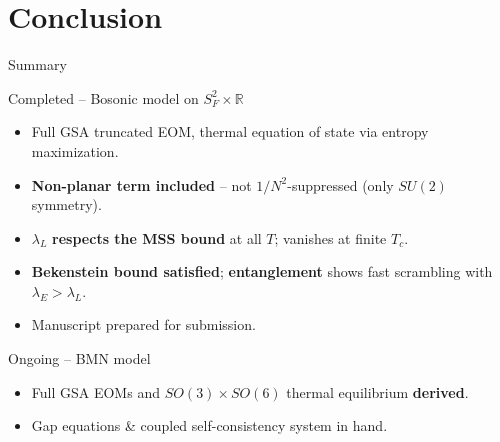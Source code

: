 \documentclass{beamer}
\newcommand{\hl}[1]{{\color{metured}\textbf{#1}}}
\newcommand{\new}[1]{{\color{metuaccent}\textbf{#1}}}
\begin{document}
\section{Conclusion}

\begin{frame}{Summary}
  \vspace{-0.9em}
  \begin{block}{Completed -- Bosonic model on $S_F^2\times\mathbb{R}$}
    \begin{itemize}
      \item Full GSA truncated EOM, thermal equation of state via entropy maximization.
      \item \new{Non-planar term included} -- not $1/N^2$-suppressed (only $SU(2)$ symmetry).
      \item $\lambda_L$ \hl{respects the MSS bound} at all $T$; vanishes at finite $T_c$.
      \item \new{Bekenstein bound satisfied}; \new{entanglement} shows fast scrambling with $\lambda_E>\lambda_L$.
      \item Manuscript prepared for submission.
    \end{itemize}
  \end{block}
  \vspace{-0.8em}
  \begin{block}{Ongoing -- BMN model}
    \begin{itemize}
      \item Full GSA EOMs and $SO(3)\times SO(6)$ thermal equilibrium \new{derived}.
      \item Gap equations \& coupled self-consistency system in hand.
    \end{itemize}
  \end{block}
\end{frame}
\end{document}

